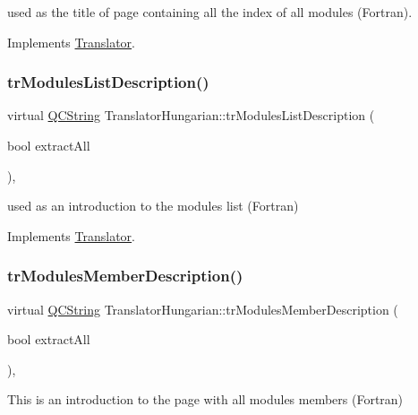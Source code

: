 used as the title of page containing all the index of all modules (Fortran). 

Implements \mbox{\hyperlink{class_translator}{Translator}}.

\mbox{\label{class_translator_hungarian_a485b8f80fa04f895b83f5a9c42856ca4}} 
\subsubsection{\texorpdfstring{trModulesListDescription()}{trModulesListDescription()}}
{\footnotesize\ttfamily virtual \mbox{\hyperlink{class_q_c_string}{Q\+C\+String}} Translator\+Hungarian\+::tr\+Modules\+List\+Description (\begin{DoxyParamCaption}\item[{bool}]{extract\+All }\end{DoxyParamCaption})\hspace{0.3cm}{\ttfamily [inline]}, {\ttfamily [virtual]}}

used as an introduction to the modules list (Fortran) 

Implements \mbox{\hyperlink{class_translator}{Translator}}.

\mbox{\label{class_translator_hungarian_acbd72b7e4dcaa11430dc90db7dd7bbaa}} 
\subsubsection{\texorpdfstring{trModulesMemberDescription()}{trModulesMemberDescription()}}
{\footnotesize\ttfamily virtual \mbox{\hyperlink{class_q_c_string}{Q\+C\+String}} Translator\+Hungarian\+::tr\+Modules\+Member\+Description (\begin{DoxyParamCaption}\item[{bool}]{extract\+All }\end{DoxyParamCaption})\hspace{0.3cm}{\ttfamily [inline]}, {\ttfamily [virtual]}}

This is an introduction to the page with all modules members (Fortran) 

